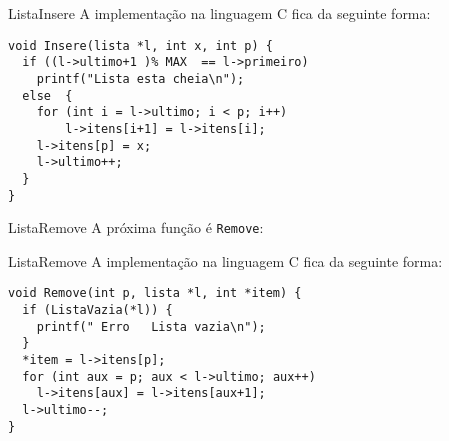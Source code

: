 \documentclass[aspectratio=169]{beamer}
\begin{document}

\begin{frame}[fragile]{Lista}{Insere}
A implementação na linguagem C fica da seguinte forma:

\begin{lstlisting}[style=CStyle]
void Insere(lista *l, int x, int p) { 
  if ((l->ultimo+1 )% MAX  == l->primeiro)
    printf("Lista esta cheia\n");
  else  { 
    for (int i = l->ultimo; i < p; i++) 
    	l->itens[i+1] = l->itens[i];
    l->itens[p] = x;
    l->ultimo++;
  }
} 
\end{lstlisting}  
\end{frame}


\begin{frame}[fragile]{Lista}{Remove}
A próxima função é \verb|Remove|:
\begin{algorithm}[H]
\caption{Remove} 
\label{Remove}
\end{algorithm}
\end{frame}


\begin{frame}[fragile]{Lista}{Remove}
A implementação na linguagem C fica da seguinte forma:

\begin{lstlisting}[style=CStyle]
void Remove(int p, lista *l, int *item) { 
  if (ListaVazia(*l)) { 
    printf(" Erro   Lista vazia\n");
  }
  *item = l->itens[p];
  for (int aux = p; aux < l->ultimo; aux++)
    l->itens[aux] = l->itens[aux+1];
  l->ultimo--;    
} 
\end{lstlisting}  
\end{frame}


\begin{frame}[plain]
  \titlepage
\end{frame}
\end{document}
